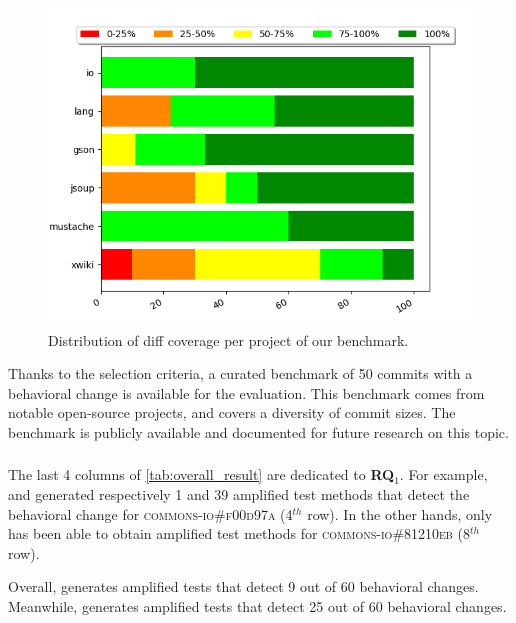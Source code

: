 \begin{figure}
	\centering
	\caption{Distribution of diff coverage per project of our benchmark.}
	\label{fig:histdiffcoverage}
	\includegraphics[width=.95\linewidth]{img/diff_cov_hist.png}
\end{figure}

Thanks to the selection criteria, 
a curated benchmark of 50 commits with a behavioral change is available for the evaluation.
This benchmark comes from notable open-source projects, and covers a diversity of commit sizes. 
The benchmark is publicly available and documented for future research on this topic.

\subsubsection{\rqdetection}
\label{subsubsec:dci:evaluation:rq1}

The last 4 columns of \autoref{tab:overall_result} are dedicated to \textbf{RQ$_1$}.
For example, \DCIA and \DCII generated respectively 1 and 39 amplified test methods that detect the behavioral change for \textsc{commons-io\#f00d97a} (4$^{th}$ row).
In the other hands, only \DCII has been able to obtain amplified test methods for \textsc{commons-io\#81210eb} (8$^{th}$ row).

Overall, \DCIA generates amplified tests that detect 9 out of 60 behavioral changes.
Meanwhile, \DCII generates amplified tests that detect 25 out of 60 behavioral changes.


